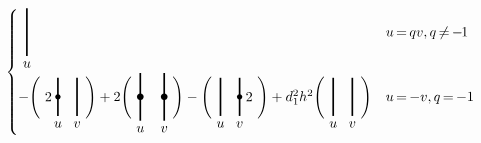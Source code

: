 \documentclass[10pt]{article}
\theoremstyle{definition}
\newcommand*{\Mk}{\mkern -2mu}
\begin{document}
\begin{multline*}
\begin{cases}
\begin{tikzpicture}[very thick,scale=.6,baseline=-3pt]
 \draw (1,0) +(0,-1) -- +(0,1) node[below,at start]{$u$};
 \end{tikzpicture}& u\Mk =\Mk qv,q\Mk \neq \Mk -\Mk 1\\
 - \Bigg(\begin{tikzpicture}[very thick,scale=.48,baseline=-3pt]
 \draw (2,0) +(0,-1) -- +(0,1) node[below,at start]{$v$};
 \draw (1,0) +(0,-1) -- +(0,1) node[below,at start]{$u$};\fill
 (1,0) circle (4pt); \node at (.5,0) {$2$};
 \end{tikzpicture}\Bigg)+2 \Bigg(\begin{tikzpicture}[very thick,scale=.6,baseline=-3pt]
 \draw (2,0) +(0,-1) -- +(0,1) node[below,at start]{$v$};
 \draw (1,0) +(0,-1) -- +(0,1) node[below,at start]{$u$};\fill (2,0) circle (4pt);\fill (1,0) circle (4pt);
 \end{tikzpicture}\Bigg)- \Bigg(\begin{tikzpicture}[very thick,scale=.48,baseline=-3pt]
 \draw (2,0) +(0,-1) -- +(0,1) node[below,at start]{$v$};
 \draw (1,0) +(0,-1) -- +(0,1) node[below,at start]{$u$};\fill
 (2,0) circle (4pt); \node at (2.5,0) {$2$}; \end{tikzpicture}\Bigg)+d_1^2h^2 \Bigg(\begin{tikzpicture}[very thick,scale=.48,baseline=-3pt]
 \draw (2,0) +(0,-1) -- +(0,1) node[below,at start]{$v$};
 \draw (1,0) +(0,-1) -- +(0,1) node[below,at start]{$u$};
 \end{tikzpicture}\Bigg)& u\Mk =\Mk -v,q\Mk =\Mk -1
 \end{cases}
 \end{multline*}
\end{document}
